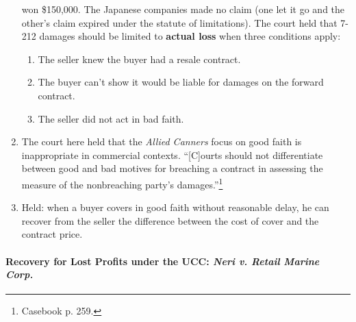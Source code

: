 \begin{enumerate}
    won \$150,000. The Japanese companies made no claim (one let it go and the 
    other's claim expired under the statute of limitations). The court held 
    that 7-212 damages should be limited to \textbf{actual loss} when three 
    conditions apply:
    \begin{enumerate}
        \item The seller knew the buyer had a resale contract.
        \item The buyer can't show it would be liable for damages on the 
        forward contract.
        \item The seller did not act in bad faith.
    \end{enumerate}
    \item The court here held that the \emph{Allied Canners} focus on good 
    faith is inappropriate in commercial contexts. ``[C]ourts should not 
    differentiate between good and bad motives for breaching a contract in 
    assessing the measure of the nonbreaching party's 
    damages.''\footnote{Casebook p. 259.}
    \item Held: when a buyer covers in good faith without reasonable delay, 
    he can recover from the seller the difference between the cost of cover 
    and the contract price.
\end{enumerate}

\paragraph{Recovery for Lost Profits under the UCC: \emph{Neri v. Retail 
Marine Corp.}}

